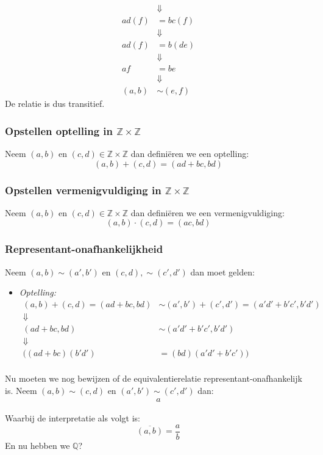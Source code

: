 \documentclass{article}
\newcommand{\Z}{\mathbb{Z}}
\newcommand{\ol}[1]{\overline{#1}}
\newcommand{\en}{\text{ en }}
\begin{document}
\begin{enumerate}[label=\arabic*]
\begin{align*}
		                         & \Downarrow       \\
		      ad(f)              & = bc(f)          \\
		                         & \Downarrow       \\
		      ad(f)              & = b(de)          \\
		                         & \Downarrow       \\
		      af                 & = be             \\
		                         & \Downarrow       \\
		      (a,b)              & \sim (e,f)
	      \end{align*}
	      De relatie is dus transitief.
\end{enumerate}
\subsubsection*{Opstellen optelling in \(\Z \times \Z \)}
Neem \((a, b) \en (c, d) \in \Z \times \Z \) dan definiëren we een optelling:
\[(a, b) + (c, d) = (ad + bc, bd)\]
\subsubsection*{Opstellen vermenigvuldiging in \( \Z \times \Z \)}
Neem \((a, b) \en (c, d) \in \Z \times \Z  \) dan definiëren we een vermenigvuldiging:
\[(a, b) \cdot (c, d) = (ac, bd)\] 
\subsubsection*{Representant-onafhankelijkheid}
Neem \((a, b)\sim (a', b') \en (c, d), \sim (c', d')\) dan moet gelden:
\begin{itemize}
	\item \emph{Optelling: } 
	\begin{align*}
		 (a, b) + (c, d) = (ad + bc, bd) &\sim (a', b') + (c', d') = (a'd' + b'c', b'd')	\\
		 \Downarrow \\
		 (ad+bc,bd ) &\sim  (a'd'+ b'c', b'd') \\
		 \Downarrow \\
		 ((ad+bc)(b'd') &= (bd)(a'd'+b'c')) \\
	\end{align*}
\end{itemize}



Nu moeten we nog bewijzen of de equivalentierelatie representant-onafhankelijk is. Neem $(a,b) \sim (c,d)$ en $(a',b') \sim (c',d')$ dan:
\begin{align*}
	a
\end{align*}

Waarbij de interpretatie als volgt is:
\[\ol{(a, b)} = \frac{a}{b}\]
En nu hebben we $\mathbb{Q}$?
\end{document}
